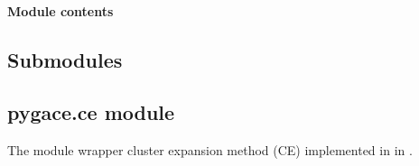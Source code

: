 \documentclass[letterpaper,10pt,english]{sphinxmanual}
\begin{document}
\paragraph{Module contents}
\label{\detokenize{pygace.scripts:module-pygace.scripts}}\label{\detokenize{pygace.scripts:module-contents}}

\subsection{Submodules}
\label{\detokenize{pygace:submodules}}

\subsection{pygace.ce module}
\label{\detokenize{pygace:module-pygace.ce}}\label{\detokenize{pygace:pygace-ce-module}}
\sphinxAtStartPar
The module wrapper cluster expansion method (CE) implemented in  in
.
\end{document}
